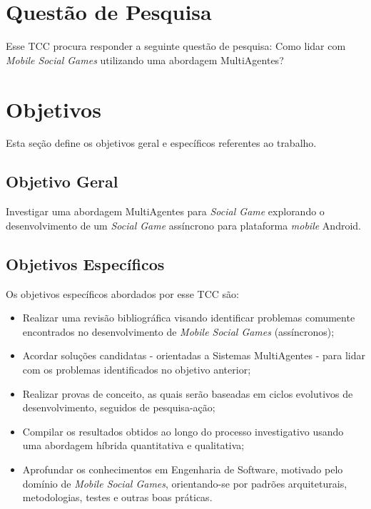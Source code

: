 \section{Questão de Pesquisa}

Esse TCC procura responder a seguinte questão de pesquisa: Como lidar com \textit{Mobile Social Games} utilizando uma abordagem MultiAgentes?


\section{Objetivos}

Esta seção define os objetivos geral e específicos referentes ao trabalho.

    \subsection{Objetivo Geral}

        Investigar uma abordagem MultiAgentes para \textit{Social Game} explorando o desenvolvimento de um \textit{Social Game} assíncrono para plataforma \textit{mobile} Android.

    \subsection{Objetivos Específicos}

        Os objetivos específicos abordados por esse TCC são:

        \begin{itemize}
          \item Realizar uma revisão bibliográfica visando identificar problemas comumente encontrados no desenvolvimento de \textit{Mobile Social Games} (assíncronos);
          \item Acordar soluções candidatas - orientadas a Sistemas MultiAgentes - para lidar com os problemas identificados no objetivo anterior;
          \item Realizar provas de conceito, as quais serão  baseadas em ciclos evolutivos de desenvolvimento, seguidos de pesquisa-ação;
          \item Compilar os resultados obtidos ao longo do processo investigativo usando uma abordagem híbrida quantitativa e qualitativa;
          \item Aprofundar os conhecimentos em Engenharia de Software, motivado pelo domínio de \textit{Mobile Social Games}, orientando-se por padrões arquiteturais, metodologias, testes e outras boas práticas.
        \end{itemize}

